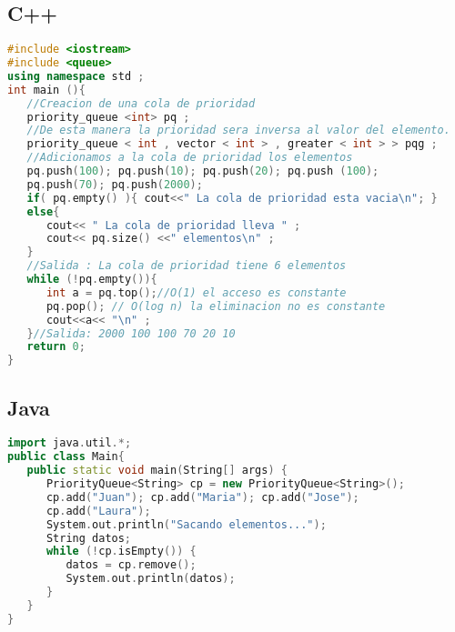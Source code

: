 \subsection{C++}
\begin{lstlisting}[language=C++]
#include <iostream>
#include <queue>
using namespace std ;
int main (){
   //Creacion de una cola de prioridad
   priority_queue <int> pq ;
   //De esta manera la prioridad sera inversa al valor del elemento.
   priority_queue < int , vector < int > , greater < int > > pqg ;
   //Adicionamos a la cola de prioridad los elementos
   pq.push(100); pq.push(10); pq.push(20); pq.push (100);
   pq.push(70); pq.push(2000);
   if( pq.empty() ){ cout<<" La cola de prioridad esta vacia\n"; } 
   else{
      cout<< " La cola de prioridad lleva " ;
      cout<< pq.size() <<" elementos\n" ;
   }
   //Salida : La cola de prioridad tiene 6 elementos
   while (!pq.empty()){
      int a = pq.top();//O(1) el acceso es constante
      pq.pop(); // O(log n) la eliminacion no es constante
      cout<<a<< "\n" ;
   }//Salida: 2000 100 100 70 20 10
   return 0;
}
\end{lstlisting}

\subsection{Java}
\begin{lstlisting}[language=C++]
import java.util.*;
public class Main{
   public static void main(String[] args) {
      PriorityQueue<String> cp = new PriorityQueue<String>();
      cp.add("Juan"); cp.add("Maria"); cp.add("Jose");
      cp.add("Laura");
      System.out.println("Sacando elementos...");
      String datos;
      while (!cp.isEmpty()) {
         datos = cp.remove();
         System.out.println(datos);
      }
   }
}
\end{lstlisting}	